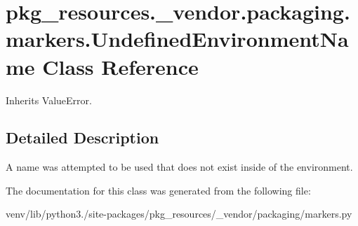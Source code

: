 \hypertarget{classpkg__resources_1_1__vendor_1_1packaging_1_1markers_1_1_undefined_environment_name}{}\section{pkg\+\_\+resources.\+\_\+vendor.\+packaging.\+markers.\+Undefined\+Environment\+Name Class Reference}
\label{classpkg__resources_1_1__vendor_1_1packaging_1_1markers_1_1_undefined_environment_name}


Inherits Value\+Error.



\subsection{Detailed Description}
\begin{DoxyVerb}A name was attempted to be used that does not exist inside of the
environment.
\end{DoxyVerb}
 

The documentation for this class was generated from the following file\+:\begin{DoxyCompactItemize}
\item 
venv/lib/python3./site-\/packages/pkg\+\_\+resources/\+\_\+vendor/packaging/markers.\+py\end{DoxyCompactItemize}
